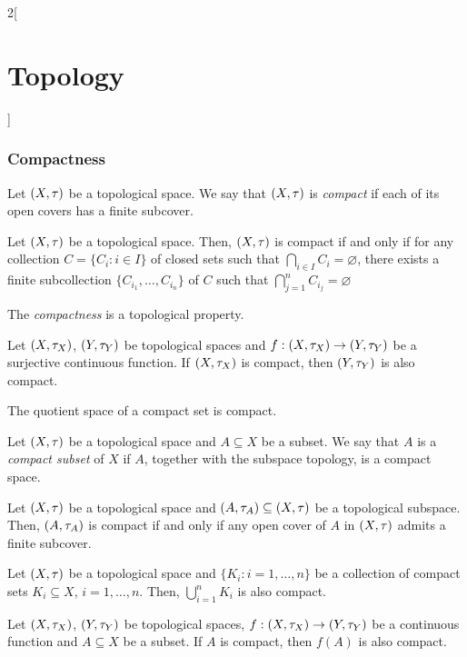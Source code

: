 \documentclass[../../../main.tex]{subfiles}
\begin{document}
\begin{multicols}{2}[\section{Topology}]
  \subsubsection{Compactness}
  \begin{definition}
    Let $(X,\tau)$ be a topological space. We say that $(X,\tau)$ is \textit{compact} if each of its open covers has a finite subcover.
  \end{definition}
  \begin{prop}
    Let $(X,\tau)$ be a topological space. Then, $(X,\tau)$ is compact if and only if for any collection $C=\{C_i:i\in I\}$ of closed sets such that $\bigcap_{i\in I} C_i=\varnothing$, there exists a finite subcollection $\{C_{i_1},\ldots,C_{i_n}\}$ of $C$ such that $\bigcap_{j=1}^n C_{i_j}=\varnothing$
  \end{prop}
  \begin{prop}
    The \textit{compactness} is a topological property.
  \end{prop}
  \begin{prop}
    Let $(X,\tau_X)$, $(Y,\tau_Y)$ be topological spaces and $f:(X,\tau_X)\rightarrow(Y,\tau_Y)$ be a surjective continuous function. If $(X,\tau_X)$ is compact, then $(Y,\tau_Y)$ is also compact.
  \end{prop}
  \begin{corollary}
    The quotient space of a compact set is compact.
  \end{corollary}
  \begin{definition}
    Let $(X,\tau)$ be a topological space and $A\subseteq X$ be a subset. We say that $A$ is a \textit{compact subset} of $X$ if $A$, together with the subspace topology, is a compact space.
  \end{definition}
  \begin{lemma}
    Let $(X,\tau)$ be a topological space and $(A,\tau_A)\subseteq (X,\tau)$ be a topological subspace. Then, $(A,\tau_A)$ is compact if and only if any open cover of $A$ in $(X,\tau)$ admits a finite subcover.
  \end{lemma}
  \begin{prop}
    Let $(X,\tau)$ be a topological space and $\{K_i:i=1,\ldots,n\}$ be a collection of compact sets $K_i\subseteq X$, $i=1,\ldots,n$. Then, $\bigcup_{i=1}^nK_i$ is also compact.
  \end{prop}
  \begin{theorem}
    Let $(X,\tau_X)$, $(Y,\tau_Y)$ be topological spaces, $f:(X,\tau_X)\rightarrow(Y,\tau_Y)$ be a continuous function and $A\subseteq X$ be a subset. If $A$ is compact, then $f(A)$ is also compact.

\end{theorem}
\end{multicols}
\end{document}
